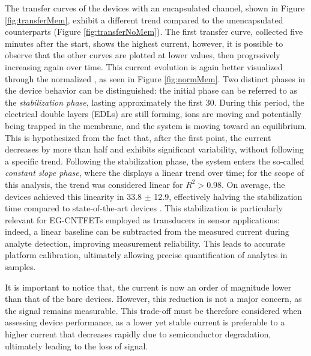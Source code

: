 The transfer curves of the devices with an encapsulated channel, shown in Figure \ref{fig:transferMem}, exhibit a different trend compared to the unencapsulated counterparts (Figure \ref{fig:transferNoMem}). The first transfer curve, collected five minutes after the start, shows the highest current, however, it is possible to observe that the other curves are plotted at lower values, then progrssively increasing again over time. This current evolution is again better visualized through the normalized \ids{}, as seen in Figure \ref{fig:normMem}. Two distinct phases in the device behavior can be distinguished: the initial phase can be referred to as the \emph{stabilization phase}, lasting approximately the first \SI{30}{\min}. During this period, the electrical double layers (EDLs) are still forming, ions are moving and potentially being trapped in the membrane, and the system is moving toward an equilibrium. This is hypothesized from the fact that, after the first point, the current decreases by more than half and exhibits significant variability, without following a specific trend. Following the stabilization phase, the system enters the so-called \emph{constant slope phase}, where the \ion{} displays a linear trend over time; for the scope of this analysis, the trend was considered linear for $R^2>0.98$. On average, the devices achieved this linearity in \SI{33.8}{} $\pm$ \SI{12.9}{\min}, effectively halving the stabilization time compared to state-of-the-art devices \citep{molazemhosseiniRapidly2021}. This stabilization is particularly relevant for EG-CNTFETs employed as transducers in sensor applications: indeed, a linear baseline can be subtracted from the measured current during analyte detection, improving measurement reliability. This leads to accurate platform calibration, ultimately allowing precise quantification of analytes in samples.

It is important to notice that, the current is now an order of magnitude lower than that of the bare devices. However, this reduction is not a major concern, as the signal remains measurable. This trade-off must be therefore considered when assessing device performance, as a lower yet stable current is preferable to a higher current that decreases rapidly due to semiconductor degradation, ultimately leading to the loss of signal.

